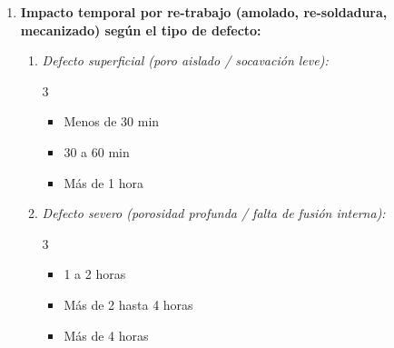 \documentclass[11pt,a4paper]{article}
\begin{document}
\begin{enumerate}[resume=encuesta, leftmargin=*]
    \item \textbf{Impacto temporal por re-trabajo (amolado, re-soldadura, mecanizado) según el tipo de defecto:}
    \begin{enumerate}[label=\alph*), leftmargin=*]
        \item \textit{Defecto superficial (poro aislado / socavación leve):}
        \begin{multicols}{3}
        \begin{itemize}[label=$\square$, leftmargin=*]
            \item Menos de 30 min
            \item 30 a 60 min
            \item Más de 1 hora
        \end{itemize}
        \end{multicols}

        \item \textit{Defecto severo (porosidad profunda / falta de fusión interna):}
        \begin{multicols}{3}
        \begin{itemize}[label=$\square$, leftmargin=*]
            \item 1 a 2 horas
            \item Más de 2 hasta 4 horas
            \item Más de 4 horas
        \end{itemize}
        \end{multicols}
    \end{enumerate}
\end{enumerate}
\end{document}
